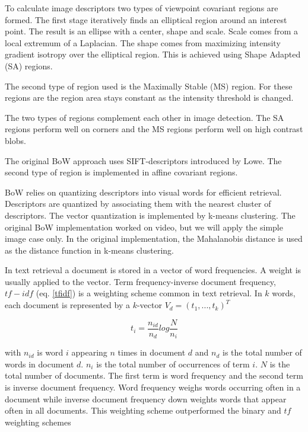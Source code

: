\documentclass[english,12pt,a4paper,pdftex,elec,utf8]{aaltothesis}
\begin{document}
To calculate image descriptors two types of viewpoint covariant regions are formed. The first stage iteratively finds an elliptical region around an interest point. The result is an ellipse with a center, shape and scale. Scale comes from a local extremum of a Laplacian. The shape comes from maximizing intensity gradient isotropy over the elliptical region. This is achieved using Shape Adapted (SA) regions.\cite{Sivic2003}

The second type of region used is the Maximally Stable (MS) region. For these regions are the region area stays constant as the intensity threshold is changed.

The two types of regions complement each other in image detection. The SA regions perform well on corners and the MS regions perform well on high contrast blobs. \cite{Sivic2003}

The original BoW approach uses SIFT-descriptors introduced by Lowe. The second type of region is implemented in affine covariant regions.

BoW relies on quantizing descriptors into visual words for efficient retrieval. Descriptors are quantized by associating them with the nearest cluster of descriptors. The vector quantization is implemented by k-means clustering. \cite{Sivic2003} The original BoW implementation worked on video, but we will apply the simple image case only. In the original implementation, the Mahalanobis distance is used as the distance function in k-means clustering.

In text retrieval a document is stored in a vector of word frequencies. A weight is usually applied to the vector. Term frequency-inverse document frequency, $tf-idf$ (eq. \ref{tfidf}) is a weighting scheme common in text retrieval. In $k$ words, each document is represented by a $k$-vector $V_{d}=(t_{1},...,t_{k})^{T}$

\begin{equation}\label{tfidf}
t_{i} = \frac{n_{id}}{n_{d}}log\frac{N}{n_{i}}
\end{equation}

with $n_{id}$ is word $i$ appearing $n$ times in document $d$ and $n_{d}$ is the total number of words in document $d$. $n_{i}$ is the total number of occurrences of term $i$. $N$ is the total number of documents. The first term is word frequency and the second term is inverse document frequency. Word frequency weighs words occurring often in a document while inverse document frequency down weights words that appear often in all documents. This weighting scheme outperformed the binary and $tf$ weighting schemes\cite{Sivic2003}
\end{document}
